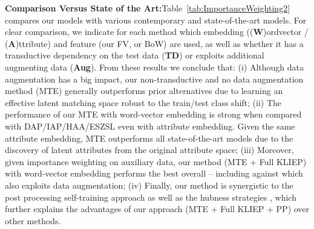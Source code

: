 \documentclass[runningheads]{llncs}
\begin{document}
\noindent\textbf{Comparison Versus State of the
  Art:}\quad  Table~\ref{tab:ImportanceWeighting2} compares our models
with various contemporary and state-of-the-art models. For clear comparison, 
we indicate for each method which embedding
((\textbf{W})ordvector / (\textbf{A})ttribute) and feature (our FV, or BoW) are used,
as well as whether it has a transductive dependency on the test data (\textbf{TD}) or
exploits additional augmenting data (\textbf{Aug}). From these results we conclude that:
(i) Although data augmentation has a big impact, our
non-transductive and no data augmentation method ({MTE}) generally
outperforms prior alternatives due to learning an effective latent
matching space robust to the train/test class shift; {(ii) The performance of our MTE with word-vector embedding is strong when compared with DAP/IAP/HAA/ESZSL even with attribute embedding. Given the same attribute embedding, MTE outperforms all state-of-the-art models due to the discovery of latent attributes from the original attribute space}; (iii)  
Moreover, given importance weighting on auxiliary data, our
method (MTE + Full KLIEP) with word-vector embedding performs the best
overall -- including against 
\cite{Xu2015} which also exploits data augmentation; (iv) Finally, our
method is synergistic to the post processing
self-training approach \cite{Fu2015} as well as the hubness strategies
\cite{dinu2014improving}, which further explains the advantages of our
approach (MTE + Full KLIEP + PP) over other methods. 
\end{document}
